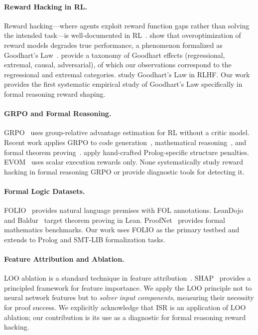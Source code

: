 \documentclass[11pt,twocolumn]{article}
\newcommand{\isr}{\textsc{ISR}}
\newcommand{\grpo}{\textsc{GRPO}}
\begin{document}
\paragraph{Reward Hacking in RL.}
Reward hacking---where agents exploit reward function gaps rather than solving the intended task---is well-documented in RL~\citep{amodei2016concrete,skalse2022defining}.
\citet{gao2023scaling} show that overoptimization of reward models degrades true performance, a phenomenon formalized as Goodhart's Law~\citep{goodhart1984problems}.
\citet{manheim2019categorizing} provide a taxonomy of Goodhart effects (regressional, extremal, causal, adversarial), of which our observations correspond to the regressional and extremal categories.
\citet{karwowski2024goodhart} study Goodhart's Law in RLHF.
Our work provides the first systematic empirical study of Goodhart's Law specifically in formal reasoning reward shaping.

\paragraph{GRPO and Formal Reasoning.}
\grpo{}~\citep{shao2024deepseekmath} uses group-relative advantage estimation for RL without a critic model.
Recent work applies \grpo{} to code generation~\citep{le2022coderl}, mathematical reasoning~\citep{wang2024mathshepherd}, and formal theorem proving~\citep{polu2023formal}.
\citet{mellgren2025prolog} apply hand-crafted Prolog-specific structure penalties.
EVOM~\citep{chen2026evom} uses scalar execution rewards only.
None systematically study reward hacking in formal reasoning \grpo{} or provide diagnostic tools for detecting it.

\paragraph{Formal Logic Datasets.}
FOLIO~\citep{han2022folio} provides natural language premises with FOL annotations.
LeanDojo~\citep{yang2023leandojo} and Baldur~\citep{first2023baldur} target theorem proving in Lean.
ProofNet~\citep{azerbayev2023proofnet} provides formal mathematics benchmarks.
Our work uses FOLIO as the primary testbed and extends to Prolog and SMT-LIB formalization tasks.

\paragraph{Feature Attribution and Ablation.}
LOO ablation is a standard technique in feature attribution~\citep{zeiler2014visualizing}.
SHAP~\citep{lundberg2017unified} provides a principled framework for feature importance.
We apply the LOO principle not to neural network features but to \emph{solver input components}, measuring their necessity for proof success.
We explicitly acknowledge that \isr{} is an application of LOO ablation; our contribution is its use as a diagnostic for formal reasoning reward hacking.
\end{document}
